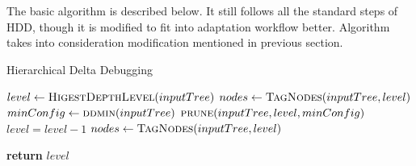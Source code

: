 The basic algorithm is described below. It still follows all the standard steps of HDD, though it is modified to fit into adaptation workflow better. Algorithm takes into consideration modification mentioned in previous section. 

\begin{algorithm}
\caption{Hierarchical Delta Debugging}
\hrulefill
\begin{algorithmic}[1]
    \State $level\gets\textsc{HigestDepthLevel}(inputTree)$
    \State $nodes\gets\textsc{TagNodes}(inputTree,level)$ 
	\State $minConfig\gets\textsc{ddmin}(inputTree)$
	\State $\textsc{prune}(inputTree,level,minConfig)$
	\State $level = level - 1$
	\State $nodes\gets\textsc{TagNodes}(inputTree,level)$ 	
	\EndWhile

    \State \textbf{return} $level$ 
\EndProcedure
\end{algorithmic}
\hrulefill
\end{algorithm}